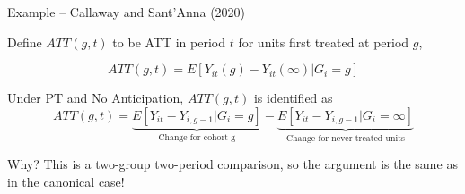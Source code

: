 \documentclass[aspectratio = 169, 13pt]{beamer}
\begin{document}
\begin{frame}{Example -- Callaway and Sant'Anna (2020)}
  \begin{wideitemize}
    \item
    Define $ATT(g,t)$ to be ATT in period $t$ for units first treated at period $g$,

    $$ATT(g,t) = E[ Y_{it}(g) - Y_{it}(\infty) | G_i = g] $$

    \pause
    \item
    Under PT and No Anticipation, $ATT(g,t)$ is identified as
    $$ATT(g,t) = \underbrace{E[ Y_{it} - Y_{i,g-1}| G_i = g]}_{\text{Change for cohort g}} -  \underbrace{E[ Y_{it} - Y_{i,g-1}| G_i = \infty]}_{\text{Change for never-treated units}} $$

    \item
    Why? \pause{} This is a two-group two-period comparison, so the argument is the same as in the canonical case!

  \end{wideitemize}
\end{frame}
\end{document}
